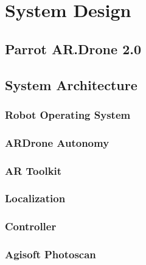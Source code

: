 
\chapter{System Design\label{ch:system}}

\section{Parrot AR.Drone 2.0}

\section{System Architecture}

\subsection{Robot Operating System}

\subsection{ARDrone Autonomy}

\subsection{AR Toolkit}

\subsection{Localization}

\subsection{Controller}

\subsection{Agisoft Photoscan}

